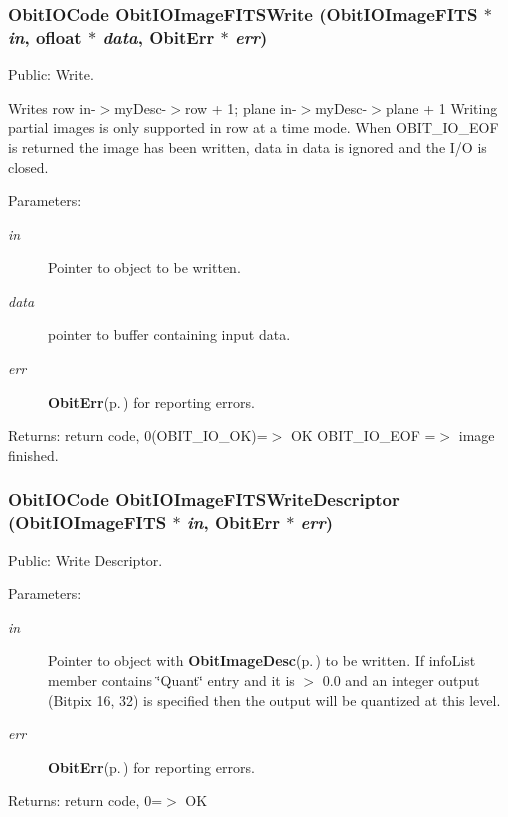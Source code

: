 \subsubsection{\setlength{\rightskip}{0pt plus 5cm}Obit\-IOCode Obit\-IOImage\-FITSWrite ({\bf Obit\-IOImage\-FITS} $\ast$ {\em in}, {\bf ofloat} $\ast$ {\em data}, {\bf Obit\-Err} $\ast$ {\em err})}\label{ObitIOImageFITS_8h_a15}


Public: Write. 

Writes row in-$>$my\-Desc-$>$row + 1; plane in-$>$my\-Desc-$>$plane + 1 Writing partial images is only supported in row at a time mode. When OBIT\_\-IO\_\-EOF is returned the image has been written, data in data is ignored and the I/O is closed. \begin{Desc}
\item[Parameters:]
\begin{description}
\item[{\em in}]Pointer to object to be written. \item[{\em data}]pointer to buffer containing input data. \item[{\em err}]{\bf Obit\-Err}{\rm (p.\,\pageref{structObitErr})} for reporting errors. \end{description}
\end{Desc}
\begin{Desc}
\item[Returns:]return code, 0(OBIT\_\-IO\_\-OK)=$>$ OK OBIT\_\-IO\_\-EOF =$>$ image finished. \end{Desc}
\subsubsection{\setlength{\rightskip}{0pt plus 5cm}Obit\-IOCode Obit\-IOImage\-FITSWrite\-Descriptor ({\bf Obit\-IOImage\-FITS} $\ast$ {\em in}, {\bf Obit\-Err} $\ast$ {\em err})}\label{ObitIOImageFITS_8h_a18}


Public: Write Descriptor. 

\begin{Desc}
\item[Parameters:]
\begin{description}
\item[{\em in}]Pointer to object with {\bf Obit\-Image\-Desc}{\rm (p.\,\pageref{structObitImageDesc})} to be written. If info\-List member contains \char`\"{}Quant\char`\"{} entry and it is $>$ 0.0 and an integer output (Bitpix 16, 32) is specified then the output will be quantized at this level. \item[{\em err}]{\bf Obit\-Err}{\rm (p.\,\pageref{structObitErr})} for reporting errors. \end{description}
\end{Desc}
\begin{Desc}
\item[Returns:]return code, 0=$>$ OK \end{Desc}
